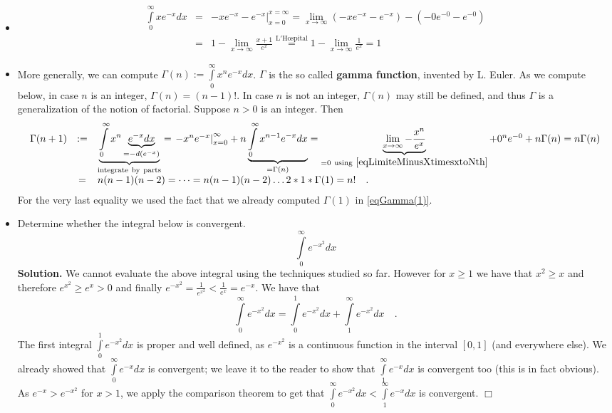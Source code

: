 \documentclass[12pt]{book}
\newenvironment{solution}{\textbf{Solution.} }{$\Box$}
\renewcommand{\emph}{\textbf}
\begin{document}
\begin{itemize}
\item 
\[ 
\begin{array}{rcl}
\int\limits_{0}^{\infty}xe^{-x}dx&=& \left.-xe^{-x} - e^{-x}\right|_{x=0}^{x=\infty}=\lim\limits_{x\to \infty}\left( -xe^{-x} -e^{-x}\right) - (-0e^{-0}-e^{-0})\\&=& 1-\lim \limits_{x\to \infty} \frac{x+1}{e^{x}}\stackrel{\mathrm{L'Hospital}}{=}1-\lim \limits_{x\to \infty} \frac{1}{e^{x}} =1
\end{array}
\]
\item More generally, we can compute $\Gamma (n):=\displaystyle\int\limits_{0}^{\infty} x^ne^{-x}dx$. $\Gamma$ is the so called \emph{gamma function}, invented by L. Euler. As we compute below, in case $n$ is an integer, $\Gamma(n)=(n-1)!$. In case $n$ is not an integer, $\Gamma(n)$ may still be defined, and thus $\Gamma$ is a generalization of the notion of factorial. Suppose $n>0$ is an integer. Then
\[
\begin{array}{rcl}
\Gamma (n+1)&:=&\underbrace{\int\limits_{0}^{\infty} x^{n}\underbrace{e^{-x}dx}_{=-d (e^{-x})}}_{\mathrm{integrate~by~parts}}=\left. -x^{n}e^{-x}\right|_{x=0}^{\infty}+ n\underbrace{\int\limits_{0}^{\infty}x^{n-1} e^{-x}dx}_{=\Gamma(n)}= \underbrace{\lim\limits_{x\to \infty} -\frac{x^{n}}{e^x}}_{=0\mathrm{~using~\eqref{eqLimiteMinusXtimesxtoNth}}}+ 0^ne^{-0}+n\Gamma(n)= n\Gamma(n)\\
&=& n(n-1)(n-2)=\dots =n(n-1)(n-2)\dots 2*1* \Gamma(1)= n!\quad .
\end{array}
\]
For the very last equality we used the fact that we already computed $\Gamma(1)$ in \eqref{eqGamma(1)}.
\item Determine whether the integral below is convergent. 
\[
\int\limits_{0}^{\infty}e^{-x^2}dx
\]
\begin{solution}
We cannot evaluate the above integral using the techniques studied so far. However  for $x\geq 1$ we have that $x^2\geq x$ and therefore $e^{x^2}\geq e^{x}>0$ and finally $e^{-x^2}= \frac{1}{e^{x^2}}<\frac{1}{e^x}= e^{-x}$. We have that 
\[
\int\limits_{0}^{\infty}e^{-x^2}dx= \int\limits_{0}^{1}e^{-x^2}dx +\int\limits_{1}^{\infty}e^{-x^2}dx\quad .
\]
The first integral $\int\limits_{0}^{1}e^{-x^2}dx$ is proper and well defined, as $e^{-x^2}$ is a continuous function in the interval $[0,1]$ (and everywhere else).  We already showed that $ \int\limits_{0}^{\infty}e^{-x}dx$ is convergent; we leave it to the reader to show that $ \int\limits_{1}^{\infty}e^{-x}dx$ is convergent too (this is in fact obvious). As $e^{-x}>e^{-x^2}$ for $x>1$, we apply the comparison theorem to get that $\int\limits_{0}^{\infty}e^{-x^2}dx<\int\limits_{1}^{\infty}e^{-x}dx$ is convergent.
\end{solution}
\end{itemize}
\end{document}

